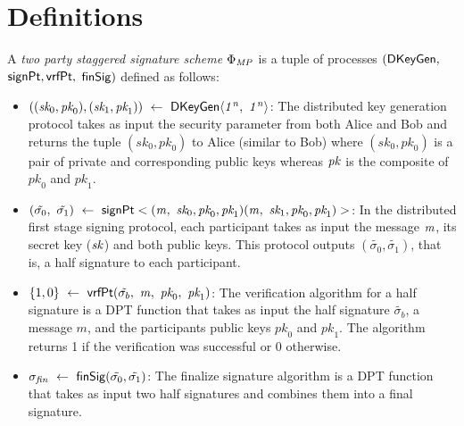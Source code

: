 \section{Definitions}
\label{sec:definitions}



\renewcommand{\varSecKeyAlice}{\textit{sk}_0}
\renewcommand{\varPubKeyAlice}{\textit{pk}_0}
\renewcommand{\varSecKeyBob}{\textit{sk}_1}
\renewcommand{\varPubKeyBob}{\textit{pk}_1}
\renewcommand{\varSigAlice}{\ensuremath{\tilde{\sigma_0}}}
\renewcommand{\varSigBob}{\ensuremath{\tilde{\sigma_1}}}
\newcommand{\varSig}{\ensuremath{\tilde{\sigma_b}}}
\newcommand{\procVerFinSig}{\ensuremath{\mathsf{vrfFinSig}}}

\begin{definition}
	
A \emph{two party staggered signature scheme $\Phi_{\mathit{MP}}$} is a tuple of processes $(\mathsf{DKeyGen},$  $\mathsf{signPt}, \mathsf{vrfPt},$ $\mathsf{finSig})$ defined as follows: 
    
    \begin{itemize}
    	\item $((\varSecKeyAlice, \varPubKeyAlice), (\varSecKeyBob, \varPubKeyBob)) \opFunResult \procKeyGenPt{\varSecParam}{\varSecParam}$: The distributed key generation protocol takes as input the security parameter from both Alice and Bob and returns the tuple $(\varSecKeyAlice, \varPubKeyAlice)$ to Alice (similar to Bob) where $(\varSecKeyAlice, \varPubKeyAlice)$ is a pair of private and corresponding public keys whereas $\mathit{pk}$ is the composite of $\varPubKeyAlice$ and $\varPubKeyBob$. 
    	
    	\item $(\varSigAlice \opSeperate \varSigBob) \opFunResult \procSignPt{\varMsg}{\varSecKeyAlice, \varPubKeyAlice, \varPubKeyBob}{\varSecKeyBob, \varPubKeyAlice, \varPubKeyBob}$: In the distributed first stage signing protocol, each participant takes as input the message $\mathit{m}$, its secret key ($\mathit{sk}$) and both public keys. This protocol outputs $(\varSigAlice, \varSigBob)$, that is, a half signature to each participant.  
    	
    	\item $\cnstTrueorFalse \opFunResult \procVerfPtSig{\varSig}{\varMsg}{\varPubKeyAlice}{\varPubKeyBob}$:  The verification algorithm for a half signature is a DPT function that takes as input the half signature $\varSig$, a message $m$, and the participants public keys $\varPubKeyAlice$ and $\varPubKeyBob$. The algorithm returns 1 if the verification was successful or 0 otherwise.
        \item $\varSigFin \opFunResult \procFinSig{\varSigAlice}{\varSigBob}$: The finalize signature algorithm is a DPT function that takes as input two half  signatures and combines them into a final signature.
        

\end{itemize}
\end{definition}

